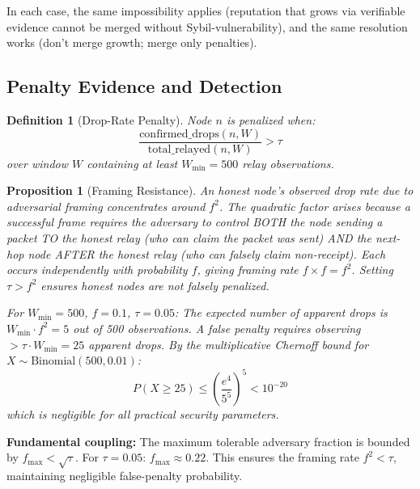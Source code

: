 \documentclass[11pt,a4paper]{article}
\newtheorem{definition}{Definition}
\newtheorem{proposition}[theorem]{Proposition}
\begin{document}
In each case, the same impossibility applies (reputation that grows via verifiable evidence cannot be merged without Sybil-vulnerability), and the same resolution works (don't merge growth; merge only penalties).

\subsection{Penalty Evidence and Detection}
\label{sec:penalty-formal}

\begin{definition}[Drop-Rate Penalty]
Node $n$ is penalized when:
\begin{equation}
    \frac{\text{confirmed\_drops}(n, W)}{\text{total\_relayed}(n, W)} > \tau
\end{equation}
over window $W$ containing at least $W_{\min} = 500$ relay observations.
\end{definition}

\begin{proposition}[Framing Resistance]
\label{prop:framing}
An honest node's observed drop rate due to adversarial framing concentrates around $f^2$. The quadratic factor arises because a successful frame requires the adversary to control BOTH the node sending a packet TO the honest relay (who can claim the packet was sent) AND the next-hop node AFTER the honest relay (who can falsely claim non-receipt). Each occurs independently with probability $f$, giving framing rate $f \times f = f^2$. Setting $\tau > f^2$ ensures honest nodes are not falsely penalized.

For $W_{\min} = 500$, $f = 0.1$, $\tau = 0.05$: The expected number of apparent drops is $W_{\min} \cdot f^2 = 5$ out of 500 observations. A false penalty requires observing $> \tau \cdot W_{\min} = 25$ apparent drops. By the multiplicative Chernoff bound for $X \sim \text{Binomial}(500, 0.01)$:
\begin{equation}
    P(X \geq 25) \leq \left(\frac{e^4}{5^5}\right)^5 < 10^{-20}
\end{equation}
which is negligible for all practical security parameters.
\end{proposition}

\textbf{Fundamental coupling:} The maximum tolerable adversary fraction is bounded by $f_{\max} < \sqrt{\tau}$. For $\tau = 0.05$: $f_{\max} \approx 0.22$. This ensures the framing rate $f^2 < \tau$, maintaining negligible false-penalty probability.

\end{document}
